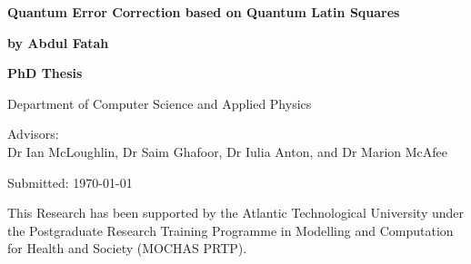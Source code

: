 \newcommand{\thesistitle}{Quantum Error Correction based on Quantum Latin Squares}
\newcommand{\thesisauthor}{by Abdul Fatah}
\newcommand{\thesisadvisor}{Advisors:\\Dr Ian McLoughlin, Dr Saim Ghafoor, Dr Iulia Anton, and Dr Marion McAfee}
\newcommand{\thesistype}{PhD Thesis}
\newcommand{\thesisdate}{Submitted: \today}
\newcommand{\thesisdepartment}{Department of Computer Science and Applied Physics}
\newcommand{\thesisfunding}{This Research has been supported by the Atlantic Technological University under the Postgraduate Research Training Programme in Modelling and Computation for Health and Society (MOCHAS PRTP).}

\begin{titlingpage}
  
  {\noindent\huge\textbf{\thesistitle}\par}
  \vspace{12mm}
  {\noindent\LARGE\textbf{\thesisauthor}\par}
  \vspace{26mm}
  {\noindent\Large\textbf{\thesistype}\par}
  \vspace{2mm}
  {\noindent\Large\thesisdepartment\par}
  \vspace{2mm}
  {\noindent\Large\thesisadvisor\par}
  \vspace{2mm}
  {\noindent\Large\thesisdate\par}
  \vspace{26mm}
  {\noindent\thesisfunding\par}

  
\end{titlingpage}